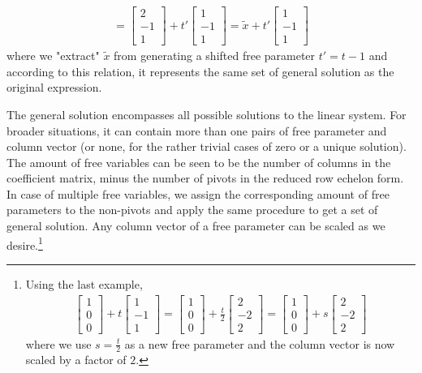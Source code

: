 {\begin{align*}
=
\begin{bmatrix}
2 \\
-1 \\
1
\end{bmatrix}
+
t'
\begin{bmatrix}
1 \\
-1 \\
1
\end{bmatrix}
= \tilde{x} + t'
\begin{bmatrix}
1 \\
-1 \\
1
\end{bmatrix}
\end{align*}
where we "extract" $\tilde{x}$ from generating a shifted free parameter $t' = t-1$ and according to this relation, it represents the same set of general solution as the original expression.}\\
\par
The general solution encompasses all possible solutions to the linear system. For broader situations, it can contain more than one pairs of free parameter and column vector (or none, for the rather trivial cases of zero or a unique solution). The amount of free variables can be seen to be the number of columns in the coefficient matrix, minus the number of pivots in the reduced row echelon form. In case of multiple free variables, we assign the corresponding amount of free parameters to the non-pivots and apply the same procedure to get a set of general solution. Any column vector of a free parameter can be scaled as we desire.\footnote{Using the last example, 
\begin{align*}
\begin{bmatrix}
1 \\
0 \\
0
\end{bmatrix}
+ t
\begin{bmatrix}
1 \\
-1 \\
1
\end{bmatrix}
=
\begin{bmatrix}
1 \\
0 \\
0
\end{bmatrix}
+ \frac{t}{2}
\begin{bmatrix}
2 \\
-2 \\
2
\end{bmatrix}
=
\begin{bmatrix}
1 \\
0 \\
0
\end{bmatrix}
+ s
\begin{bmatrix}
2 \\
-2 \\
2
\end{bmatrix}
\end{align*} where we use $s = \frac{t}{2}$ as a new free parameter and the column vector is now scaled by a factor of $2$.} \\
